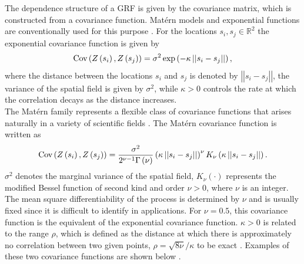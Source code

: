 The dependence structure of a GRF is given by the covariance matrix, which is constructed from a covariance function. Matérn models and exponential functions are conventionally used for this purpose \autocite[][]{gelfand2010handbook}. For the locations $s_i, s_j\in\mathbb{R}^2$ the exponential covariance function is given by
\begin{equation}
\hbox{Cov}\left(Z\left(s_i\right), Z\left(s_j\right)\right)=\sigma^2\exp\left(-\kappa\left|\left|s_i-s_j\right|\right|\right),
\end{equation}
where the distance between the locations $s_i$ and $s_j$ is denoted by $\left|\left|s_i-s_j\right|\right|$, the variance of the spatial field is given by $\sigma^2$, while $\kappa>0$ controls the rate at which the correlation decays as the distance increases. \\
The Matérn family represents a flexible class of covariance functions that arises naturally in a variety of scientific fields \autocite[][]{guttorp2006studies}. The Matérn covariance function is written as
\begin{equation}
    \hbox{Cov}\left(Z\left(s_i\right),Z\left(s_j\right)\right)=\frac{\sigma^2}{2^{\nu-1}\Gamma\left(\nu\right)}\left(\kappa\left|\left|s_i-s_j\right|\right|\right)^{\nu}K_\nu\left(\kappa\left|\left|s_i-s_j\right|\right|\right).
\end{equation}
$\sigma^2$ denotes the marginal variance of the spatial field, $K_\nu\left(\cdot\right)$ represents the modified Bessel function of second kind and order $\nu>0$, where $\nu$ is an integer. The mean square differentiability of the process is determined by $\nu$ and is usually fixed since it is difficult to identify in applications. For $\nu=0.5$, this covariance function is the equivalent of the exponential covariance function. $\kappa > 0$ is related to the range $\rho$, which is defined as the distance at which there is approximately no correlation between two given points, $\rho=\sqrt{8\nu}/\kappa$ to be exact \autocite[][]{cameletti2013spatio}. Examples of these two covariance functions are shown below \autocite[][]{moraga2019geospatial}. 
